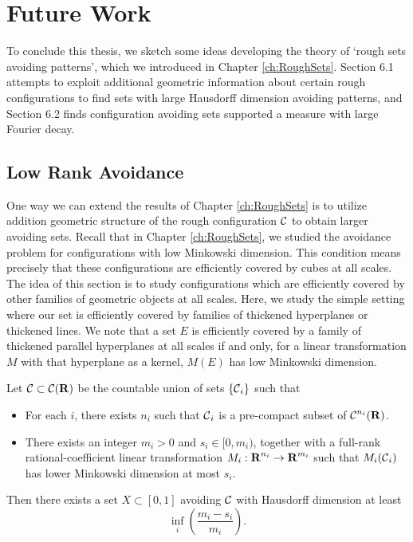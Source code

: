 
\chapter{Future Work}
\label{ch:Conclusions}

To conclude this thesis, we sketch some ideas developing the theory of `rough sets avoiding patterns', which we introduced in Chapter \ref{ch:RoughSets}. Section 6.1 attempts to exploit additional geometric information about certain rough configurations to find sets with large Hausdorff dimension avoiding patterns, and Section 6.2 finds configuration avoiding sets supported a measure with large Fourier decay.

\section{Low Rank Avoidance}

One way we can extend the results of Chapter \ref{ch:RoughSets} is to utilize addition geometric structure of the rough configuration $\operatorname{\mathcal{C}}$ to obtain larger avoiding sets. Recall that in Chapter \ref{ch:RoughSets}, we studied the avoidance problem for configurations with low Minkowski dimension. This condition means precisely that these configurations are efficiently covered by cubes at all scales. The idea of this section is to study configurations which are efficiently covered by other families of geometric objects at all scales. Here, we study the simple setting where our set is efficiently covered by families of thickened hyperplanes or thickened lines. We note that a set $E$ is efficiently covered by a family of thickened parallel hyperplanes at all scales if and only, for a linear transformation $M$ with that hyperplane as a kernel, $M(E)$ has low Minkowski dimension.

\begin{theorem} \label{theorem9063909014901}
    Let $\operatorname{\mathcal{C}} \subset \operatorname{\mathcal{C}}(\operatorname{\mathbf{R}})$ be the countable union of sets $\{ \operatorname{\mathcal{C}}_i \}$ such that
    \begin{itemize}
        \item For each $i$, there exists $n_i$ such that $\operatorname{\mathcal{C}}_i$ is a pre-compact subset of $\operatorname{\mathcal{C}}^{n_i}(\operatorname{\mathbf{R}})$.

        \item There exists an integer $m_i > 0$ and $s_i \in [0,m_i)$, together with a full-rank rational-coefficient linear transformation $M_i: \operatorname{\mathbf{R}}^{n_i} \to \operatorname{\mathbf{R}}^{m_i}$ such that $M_i(\operatorname{\mathcal{C}}_i)$ has lower Minkowski dimension at most $s_i$.
    \end{itemize}
    Then there exists a set $X \subset [0,1]$ avoiding $\operatorname{\mathcal{C}}$ with Hausdorff dimension at least
    \[ \inf_i \left( \frac{m_i - s_i}{m_i} \right). \]
\end{theorem}

